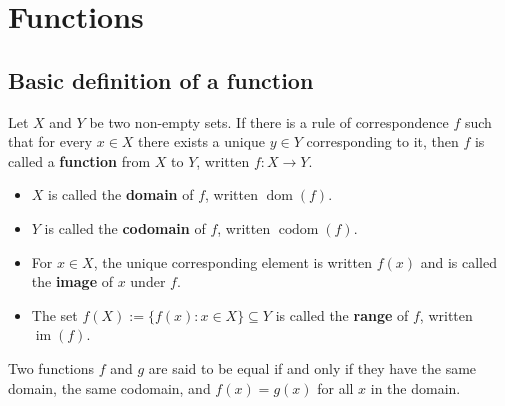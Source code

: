 \section{\texorpdfstring{Functions}{Functions}}

\subsection{\texorpdfstring{Basic definition of a function}{Basic definition of a function}}

\begin{definition}[Function]\label{def:function}
Let $X$ and $Y$ be two non-empty sets. If there is a rule of correspondence $f$ such that for every $x \in X$ there exists a unique $y \in Y$ corresponding to it, then $f$ is called a \textbf{function} from $X$ to $Y$, written $f: X \to Y$.
\begin{itemize}
    \item $X$ is called the \textbf{domain} of $f$, written $\operatorname{dom}(f)$.
    \item $Y$ is called the \textbf{codomain} of $f$, written $\operatorname{codom}(f)$.
    \item For $x \in X$, the unique corresponding element is written $f(x)$ and is called the \textbf{image} of $x$ under $f$.
    \item The set $f(X) := \{f(x) : x \in X\} \subseteq Y$ is called the \textbf{range} of $f$, written $\operatorname{im}(f)$.
\end{itemize}
Two functions $f$ and $g$ are said to be equal if and only if they have the same domain, the same codomain, and $f(x)=g(x)$ for all $x$ in the domain.
\end{definition}


